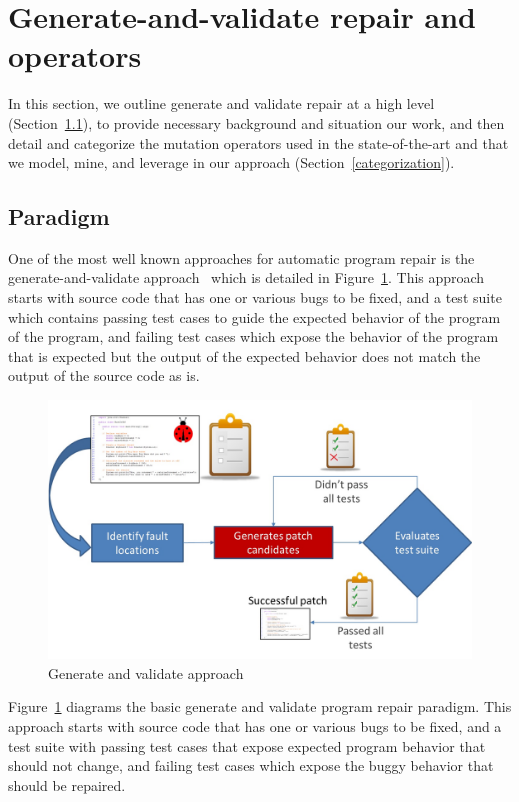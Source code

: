 \documentclass[conference]{IEEEtran}
\begin{document}
\section{Generate-and-validate repair and operators} 
\label{background}

In this section, we outline generate and validate repair at a high level
(Section~\ref{sec-paradigm}), to provide necessary background and situation our
work, and then detail and categorize the mutation operators used in the
state-of-the-art and that we model, mine, and leverage in our approach
(Section~\ref{categorization}).  
 
 
\subsection{Paradigm}
\label{sec-paradigm}


One of the most well known approaches for automatic program repair is the
generate-and-validate approach~\cite{legoues12} which is detailed in Figure~\ref{fig:generateandvalidate}. This approach starts with source code that
has one or various bugs to be fixed, and a test suite which contains passing
test cases to guide the expected behavior of the program of the program, and failing test 
cases which expose the behavior of the program that is expected but the output
of the expected behavior does not match the output of the source code as is.

\begin{figure}[!h]
  \centering
    \includegraphics[scale=0.25]{Picture1}
  \caption{Generate and validate approach}
  \label{fig:generateandvalidate}
\end{figure}

Figure~\ref{fig:generateandvalidate} diagrams the basic generate and validate
program repair paradigm. This approach starts with source code that
has one or various bugs to be fixed, and a test suite with passing
test cases that expose expected program behavior that should not change, and failing test 
cases which expose the buggy behavior that should be repaired.  
\end{document}
